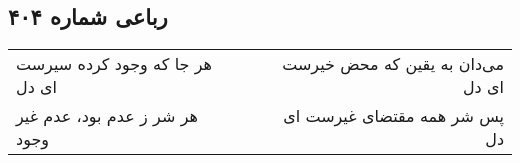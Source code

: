\begin{center}
\section*{رباعی شماره ۴۰۴}
\label{sec:sh404}
\begin{longtable}{l p{0.5cm} r}
هر جا که وجود کرده سیرست ای دل
&&
می‌دان به یقین که محض خیرست ای دل
\\
هر شر ز عدم بود، عدم غیر وجود
&&
پس شر همه مقتضای غیرست ای دل
\\
\end{longtable}
\end{center}
